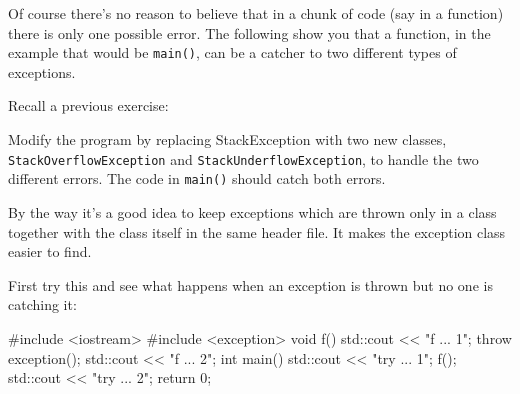 \newpage{}

Of course there's no reason to believe that in a chunk
of code (say in a function) there is only one possible error. The
following show you that a function, in the example that would be
\texttt{main()}, can be a catcher to two different types of exceptions.



\begin{ex}
Recall a previous exercise:

\begin{console}[commanchars=\~\@\$]
#include <iostream>
#include <cmath>
#include <ctime>

~EMPHASIZE@class StackException$
~EMPHASIZE@{};$

class Stack
{     
public:
      ...
      void push(int i)
      {    
           ~EMPHASIZE@if (size == 5)$
                 ~EMPHASIZE@throw StackException();$
           ...
      }
      int pop()
      {   
          ~EMPHASIZE@if (size == 0)$
                 ~EMPHASIZE@throw StackException();$
          ...
      }
  ...
};



int main()
{   
    srand((unsigned) time(NULL));
    Stack stack;

    try
    {   
        while (1)
        {     
              int option;
              std::cin >> option;
              switch (option)
              {
                    case 0: stack.push(rand()); break;
                    case 1: stack.pop(); break;}}}}
              }
              std::cout << stack << std::endl;
         }
     }
     catch (~EMPHASIZE@StackException e$)
     {
          std::cout << "stack error" << std::endl;
     }
} 
\end{console}

Modify the program by replacing StackException with two new classes,
\texttt{StackOverflowException} and \texttt{StackUnderflowException}, to
handle the two different errors. The code in \texttt{main()} should catch
both errors.

By the way it's a good idea to keep exceptions which are
thrown only in a class together with the class itself in the same header
file. It makes the exception class easier to find.

\newpage{}

First try this and see what happens when an exception is thrown but no
one is catching it:
\begin{console}
#include <iostream>
#include <exception>
void f()
{    
     std::cout << "f ... 1\n";
     throw exception();
     std::cout << "f ... 2\n";
}
int main()
{   
    std::cout << "try ... 1\n";
    f();
    std::cout << "try ... 2\n";
    return 0;
}
\end{console}


\end{ex}
